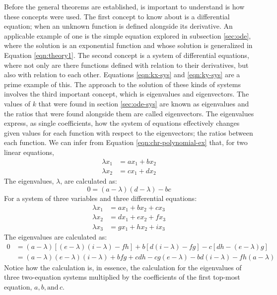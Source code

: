 \documentclass[12pt]{article}
\begin{document}
	Before the general theorems are established, is important to understand is how these concepts were used.
	The first concept to know about is a differential equation; when an unknown function is defined alongside its derivative.
	An applicable example of one is the simple equation explored in subsection \ref{sec:ode}, where the solution is an exponential function and whose solution is generalized in Equation \eqref{eqn:theory1}.
	The second concept is a system of differential equations, where not only are there functions defined with relation to their derivatives, but also with relation to each other.
	Equations \eqref{eqn:kx-sys} and \eqref{eqn:ky-sys} are a prime example of this.
	The approach to the solution of these kinds of systems involves the third important concept, which is eigenvalues and eigenvectors.
	The values of $k$ that were found in section \ref{sec:ode-sys} are known as eigenvalues and the ratios that were found alongside them are called eigenvectors.
	The eigenvalues express, as single coefficients, how the system of equations effectively changes given values for each function with respect to the eigenvectors; the ratios between each function.
	We can infer from Equation \eqref{eqn:chr-polynomial-ex} that, for two linear equations,
	\begin{align*}
		\lambda x_1 &= ax_1 + bx_2 \\
		\lambda x_2 &= cx_1 + dx_2
	\end{align*}
	The eigenvalues, $\lambda$, are calculated as:
	\begin{equation}
		0 = (a - \lambda)(d - \lambda) - bc
	\end{equation}
	For a system of three variables and three differential equations:
	\begin{align*}
		\lambda x_1 &= ax_1 + bx_2 + cx_3 \\
		\lambda x_2 &= dx_1 + ex_2 + fx_3 \\
		\lambda x_3 &= gx_1 + hx_2 + ix_3
	\end{align*}
	The eigenvalues are calculated as:
	\begin{align*}
		0 &= (a - \lambda)[(e - \lambda)(i - \lambda) - fh] + b[d(i - \lambda) - fg] - c[dh - (e - \lambda)g] \\
		&= (a - \lambda)(e - \lambda)(i - \lambda) + bfg + cdh - cg(e - \lambda) - bd(i - \lambda) - fh(a - \lambda)
	\end{align*}
	Notice how the calculation is, in essence, the calculation for the eigenvalues of three two-equation systems multiplied by the coefficients of the first top-most equation, $a, b, \text{and}\, c$.
\end{document}
